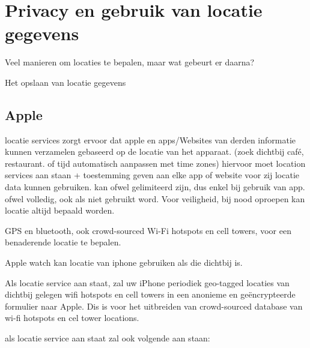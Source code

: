 \chapter{Privacy en gebruik van locatie gegevens}
\label{ch:opslaangebruiklocatiegegevens}
Veel manieren om locaties te bepalen, maar wat gebeurt er daarna?

Het opslaan van locatie gegevens

\section{Apple}
locatie services zorgt ervoor dat apple en apps/Websites van derden informatie kunnen verzamelen gebaseerd op de locatie van het apparaat. (zoek dichtbij café, restaurant. of tijd automatisch aanpassen met time zones)
hiervoor moet location services aan staan + toestemming geven aan elke app of website voor zij locatie data kunnen gebruiken. kan ofwel gelimiteerd zijn, dus enkel bij gebruik van app. ofwel volledig, ook als niet gebruikt word.
Voor veiligheid, bij nood oproepen kan locatie altijd bepaald worden.

GPS en bluetooth, ook crowd-sourced Wi-Fi hotspots en cell towers, voor een benaderende locatie te bepalen.

Apple watch kan locatie van iphone gebruiken als die dichtbij is.

Als locatie service aan staat, zal uw iPhone periodiek geo-tagged locaties van dichtbij gelegen wifi hotspots en cell towers in een anonieme en geëncrypteerde formulier naar Apple. Dis is voor het uitbreiden van crowd-sourced database van wi-fi hotspots en cel tower locations.

als locatie service aan staat zal ook volgende aan staan:

